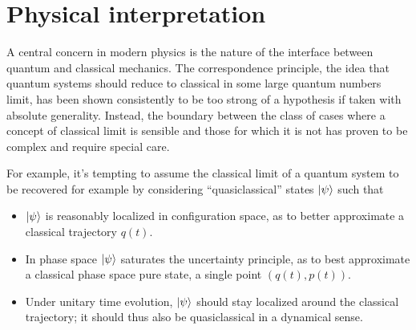 \documentclass{article}
\newcommand{\T}{\ensuremath{\vartheta}}
\newcommand{\sumZ}{\sum_{n=-\infty}^{\infty}}
\begin{document}
%
%
%
%
%


\section{Physical interpretation}

A central concern in modern physics is the nature of the interface between quantum and classical mechanics. The correspondence principle, the idea that quantum systems should reduce to classical in some large quantum numbers limit, has been shown consistently to be too strong of a hypothesis if taken with absolute generality. Instead, the boundary between the class of cases where a concept of classical limit is sensible and those for which it is not has proven to be complex and require special care.

For example, it's tempting to assume the classical limit of a quantum system to be recovered for example by considering ``quasiclassical'' states $\ket \psi$ such that

\begin{itemize}
    \item $\ket \psi$ is reasonably localized in configuration space, as to better approximate a classical trajectory $q(t)$.
    \item In phase space $\ket \psi$ saturates the uncertainty principle, as to best approximate a classical phase space pure state, a single point $(q(t),p(t))$.
    \item Under unitary time evolution, $\ket \psi$ should stay localized around the classical trajectory; it should thus also be quasiclassical in a dynamical sense.
\end{itemize}
\end{document}
